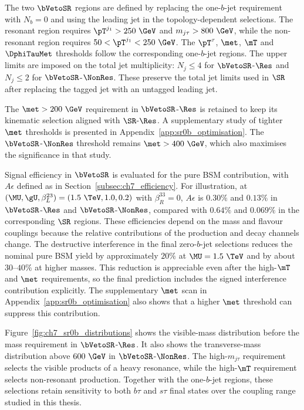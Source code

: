 The two $\bVetoSR$ regions are defined by replacing the one-$b$-jet requirement with $N_b=0$ and using the leading jet in the topology-dependent selections.
The resonant region requires $\pT^{j_1}>250~\GeV$ and $m_{j\tau}>800~\GeV$, while the non-resonant region requires $50<\pT^{j_1}<250~\GeV$.
The $\pT^\tau$, $\met$, $\mT$ and $\DphiTauMet$ thresholds follow the corresponding one-$b$-jet regions.
The upper limits are imposed on the total jet multiplicity: $N_j\leq4$ for $\bVetoSR$-$\Res$ and $N_j\leq2$ for $\bVetoSR$-$\NonRes$.
These preserve the total jet limits used in $\SR$ after replacing the tagged jet with an untagged leading jet.

The $\met>200~\GeV$ requirement in $\bVetoSR$-$\Res$ is retained to keep its kinematic selection aligned with $\SR$-$\Res$.
A supplementary study of tighter $\met$ thresholds is presented in Appendix~\ref{app:sr0b_optimisation}.
The $\bVetoSR$-$\NonRes$ threshold remains $\met>400~\GeV$, which also maximises the significance in that study.

Signal efficiency in $\bVetoSR$ is evaluated for the pure BSM contribution, with $A\epsilon$ defined as in Section~\ref{subsec:ch7_efficiency}.
For illustration, at $(\MU,\gU,\beta_L^{23})=(1.5~\TeV,1.0,0.2)$ with $\beta_R^{33}=0$, $A\epsilon$ is $0.30\%$ and $0.13\%$ in $\bVetoSR$-$\Res$ and $\bVetoSR$-$\NonRes$, compared with $0.64\%$ and $0.069\%$ in the corresponding $\SR$ regions.
These efficiencies depend on the mass and flavour couplings because the relative contributions of the production and decay channels change.
The destructive interference in the final zero-$b$-jet selections reduces the nominal pure BSM yield by approximately $20\%$ at $\MU=1.5~\TeV$ and by about $30$--$40\%$ at higher masses.
This reduction is appreciable even after the high-$\mT$ and $\met$ requirements, so the final prediction includes the signed interference contribution explicitly.
The supplementary $\met$ scan in Appendix~\ref{app:sr0b_optimisation} also shows that a higher $\met$ threshold can suppress this contribution.

Figure~\ref{fig:ch7_sr0b_distributions} shows the visible-mass distribution before the mass requirement in $\bVetoSR$-$\Res$.
It also shows the transverse-mass distribution above $600~\GeV$ in $\bVetoSR$-$\NonRes$.
The high-$m_{j\tau}$ requirement selects the visible products of a heavy resonance, while the high-$\mT$ requirement selects non-resonant production.
Together with the one-$b$-jet regions, these selections retain sensitivity to both $b\tau$ and $s\tau$ final states over the coupling range studied in this thesis.

